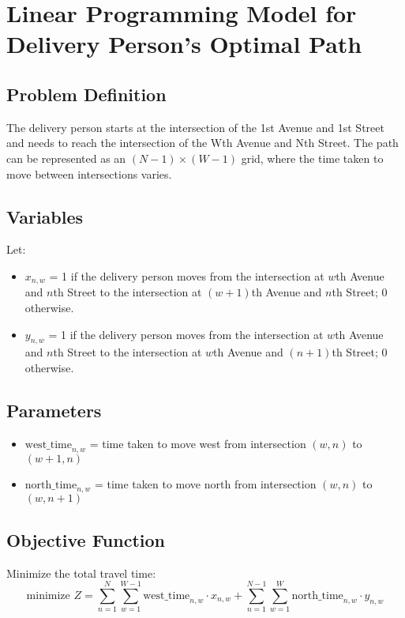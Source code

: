 \documentclass{article}
\begin{document}
\section*{Linear Programming Model for Delivery Person's Optimal Path}

\subsection*{Problem Definition}
The delivery person starts at the intersection of the 1st Avenue and 1st Street and needs to reach the intersection of the Wth Avenue and Nth Street. The path can be represented as an \( (N-1) \times (W-1) \) grid, where the time taken to move between intersections varies.

\subsection*{Variables}
Let:\\
\begin{itemize}
    \item \( x_{n,w} \) = 1 if the delivery person moves from the intersection at \( w \)th Avenue and \( n \)th Street to the intersection at \( (w+1) \)th Avenue and \( n \)th Street; 0 otherwise.
    \item \( y_{n,w} \) = 1 if the delivery person moves from the intersection at \( w \)th Avenue and \( n \)th Street to the intersection at \( w \)th Avenue and \( (n+1) \)th Street; 0 otherwise.
\end{itemize}

\subsection*{Parameters}
\begin{itemize}
    \item \( \text{west\_time}_{n,w} \) = time taken to move west from intersection \( (w,n) \) to \( (w+1,n) \)
    \item \( \text{north\_time}_{n,w} \) = time taken to move north from intersection \( (w,n) \) to \( (w,n+1) \)
\end{itemize}

\subsection*{Objective Function}
Minimize the total travel time:
\[
\text{minimize } Z = \sum_{n=1}^{N} \sum_{w=1}^{W-1} \text{west\_time}_{n,w} \cdot x_{n,w} + \sum_{n=1}^{N-1} \sum_{w=1}^{W} \text{north\_time}_{n,w} \cdot y_{n,w}
\]
\end{document}
